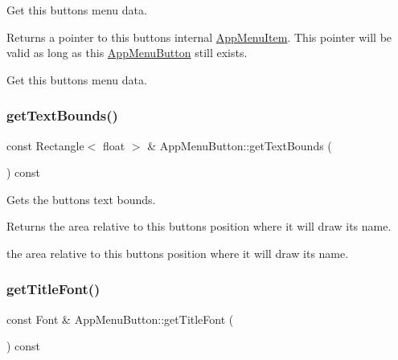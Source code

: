 Get this button\textquotesingle{}s menu data.

\begin{DoxyReturn}{Returns}
a pointer to this button\textquotesingle{}s internal \mbox{\hyperlink{classAppMenuItem}{App\+Menu\+Item}}. This pointer will be valid as long as this \mbox{\hyperlink{classAppMenuButton}{App\+Menu\+Button}} still exists.
\end{DoxyReturn}
Get this button\textquotesingle{}s menu data. \mbox{\label{classAppMenuButton_ac7893a9e707238feb9fe367d6e444446}} 
\subsubsection{\texorpdfstring{get\+Text\+Bounds()}{getTextBounds()}}
{\footnotesize\ttfamily const Rectangle$<$ float $>$ \& App\+Menu\+Button\+::get\+Text\+Bounds (\begin{DoxyParamCaption}{ }\end{DoxyParamCaption}) const\hspace{0.3cm}{\ttfamily [protected]}}

Gets the button\textquotesingle{}s text bounds.

\begin{DoxyReturn}{Returns}
the area relative to this button\textquotesingle{}s position where it will draw its name.

the area relative to this button\textquotesingle{}s position where it will draw its name. 
\end{DoxyReturn}
\mbox{\label{classAppMenuButton_aa0659bfa4729f2a3ce5c62bbf1205fc9}} 
\subsubsection{\texorpdfstring{get\+Title\+Font()}{getTitleFont()}}
{\footnotesize\ttfamily const Font \& App\+Menu\+Button\+::get\+Title\+Font (\begin{DoxyParamCaption}{ }\end{DoxyParamCaption}) const\hspace{0.3cm}{\ttfamily [protected]}}

